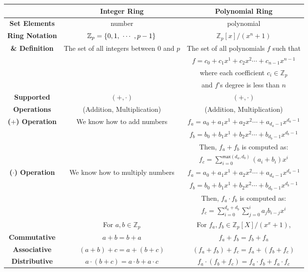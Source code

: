 \begin{table}[h]
\centering
\footnotesize
\begin{tabular}{|c||c|c|} %
\hline
&\textbf{Integer Ring} & \textbf {Polynomial Ring} \\
\hline
\hline
\textbf{{Set Elements}} & number & polynomial \\
\hline
\textbf{{Ring Notation}} & $\mathbb{Z}_p = \{0, 1, \text{ } \text{$\cdots$} \text{ }, p - 1\}$  & $\mathbb{Z}_p[x] / (x^n + 1)$ \\
\textbf{{\& Definition}} & The set of all integers between $0$ and $p$ & The set of all polynomials $f$ such that\\
&& $f= c_0 + c_1x^1 + c_2x^2 \cdots + c_{n-1}x^{n-1}$ \\
&& where each coefficient $c_i \in \mathbb{Z}_p$ \\
&& and $f$'s degree is less than $n$ \\
\hline
\textbf{{Supported}}&$(+, \cdot)$& $(+, \cdot)$ \\
\textbf{{Operations}}&(Addition, Multiplication)& (Addition, Multiplication) \\
\hline
\textbf{{($+$) Operation}} & We know how to add numbers & $f_a = a_0 + a_1x^1 + a_2x^2 \cdots + a_{d_a-1}x^{d_a-1}$ \\
 & & $f_b = b_0 + b_1x^1 + b_2x^2 \cdots + b_{d_b-1}x^{d_b-1}$ \\
 & & Then, $f_a + f_b$ is computed as: \\
 & & $f_c = \sum\limits_{i=0}^{\textsf{max}(d_a,d_b)}(a_i+b_i)x^i$ \\
\hline
\textbf{{($\cdot$) Operation}} & We know how to multiply numbers & $f_a = a_0 + a_1x^1 + a_2x^2 \cdots + a_{d_a-1}x^{d_a-1}$ \\
 & & $f_b = b_0 + b_1x^1 + b_2x^2 \cdots + b_{d_b-1}x^{d_b-1}$ \\
 & & Then, $f_a \cdot f_b$ is computed as: \\
 & & $f_c = \sum\limits_{i=0}^{d_a+d_b}\sum\limits_{j=0}^{i}a_jb_{i-j}x^i$ \\
\hline
& For $a, b \in \mathbb{Z}_p$ & For $f_a, f_b \in \mathbb{Z}_p[X]/(x^x + 1)$,\\
\textbf{{Commutative}}  & $ a + b = b + a$ & $f_a + f_b = f_b + f_a$\\
\textbf{{Associative}} & $(a + b) + c = a + (b + c)$ & $(f_a + f_b) + f_c = f_a + (f_b + f_c)$\\
\textbf{{Distributive}} & $a \cdot (b + c) = a\cdot b + a\cdot c$ & $f_a \cdot (f_b + f_c) = f_a\cdot f_b + f_a\cdot f_c$\\

\end{tabular}
\end{table}
